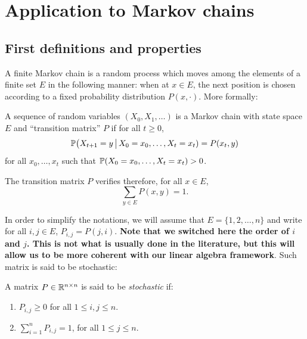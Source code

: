 \documentclass[11pt,nocut]{article}
\begin{document}

\section{Application to Markov chains}

\subsection{First definitions and properties}

A finite Markov chain is a random process which moves among the elements of a finite set $E$ in the following manner: when at $x \in E$, the next position is chosen according to a fixed probability distribution $P(x, \cdot)$. More formally:

\begin{definition}
	A sequence of random variables $(X_0, X_1, \dots)$ is a Markov chain with state space $E$ and ``transition matrix'' $P$ if for all $t \geq 0$, 
	$$
	\P\big( X_{t+1} = y \, \big| \, X_0= x_0, \dots, X_t = x_t ) = P(x_t,y)
	$$
	for all $x_0, \dots, x_t$ such that $\P(X_0 = x_0, \dots, X_t = x_t) >0$.
\end{definition}

The transition matrix $P$ verifies therefore, for all $x \in E$,
\begin{equation}
	\sum_{y \in E} P(x,y) = 1.
\end{equation}

In order to simplify the notations, we will assume that $E = \{1,2, \dots, n\}$ and write for all $i,j \in E$, $P_{i,j} = P(j,i)$. 
\textbf{Note that we switched here the order of $i$ and $j$. This is not what is usually done in the literature, but this will allow us to be more coherent with our linear algebra framework}.
Such matrix is said to be stochastic:

\begin{definition}
	A matrix $P \in \R^{n \times n}$ is said to be \emph{stochastic} if:
	\begin{enumerate}[label=(\roman*),noitemsep]
		\item $P_{i,j} \geq 0$ for all $1 \leq i,j \leq n$.
		\item $\sum\limits_{i=1}^n P_{i,j} = 1$, for all $1 \leq j \leq n$.
	\end{enumerate}
\end{definition}
\end{document}

